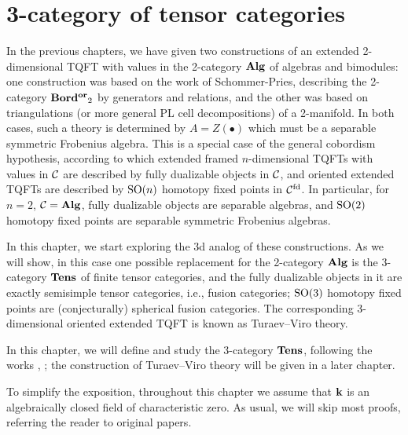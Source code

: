 \chapter{3-category of tensor categories}\label{c:3cat-tens}

In the previous chapters, we have given two constructions of an extended
2-dimensional TQFT with values in the 2-category $\mathbf{Alg}$ of algebras and
bimodules: one construction was based on the work of Schommer-Pries, describing
the 2-category $\mathbf{Bord^{or}}_2$ by generators and relations, and the other was based
on triangulations (or more general PL cell decompositions) of a 2-manifold. In
both cases, such a theory is determined by $A=Z(\bullet)$ which must be a
separable symmetric Frobenius algebra. This is a special case of the general
cobordism hypothesis, according to which extended framed $n$-dimensional TQFTs
with values in $\mathcal{C}$ are described by fully dualizable objects in $\mathcal{C}$, and
oriented extended TQFTs are described by $\mathrm{SO}(n)$ homotopy fixed points in
$\mathcal{C}^{{\mathrm{fd}}}$. In particular, for $n=2$, $\mathcal{C}=\mathbf{Alg}$, fully dualizable objects
are separable algebras, and $\mathrm{SO}(2)$ homotopy fixed points are
separable symmetric Frobenius algebras.

In this chapter, we start exploring the 3d analog of these constructions. As we
will show, in this case one possible replacement for the 2-category $\mathbf{Alg}$ is
the 3-category $\mathbf{Tens}$ of finite tensor categories, and the fully dualizable
objects in it are exactly semisimple tensor categories, i.e., fusion categories;
$\mathrm{SO}(3)$ homotopy fixed points are (conjecturally) spherical fusion categories.
The corresponding 3-dimensional oriented extended TQFT is known as Turaev--Viro
theory.

In this chapter, we will define and study the 3-category $\mathbf{Tens}$, following
the works \cite{dsps-balanced}, \cite{dsps-dualizable}; the construction of
Turaev--Viro theory will be given in a later chapter.

To simplify the exposition, throughout this chapter we assume that $\mathbf{k}$ is an
algebraically closed field of characteristic zero. As usual, we will skip most
proofs, referring the reader to original papers.

